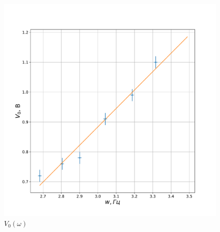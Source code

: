 \documentclass[a4paper, 12pt]{article}
\begin{document}
\begin{figure}[H]
    \centering
    \includegraphics[scale=0.5]{V0}
    \caption {$V_0 (\omega)$}
\end{figure}

 
	
\end{document}
